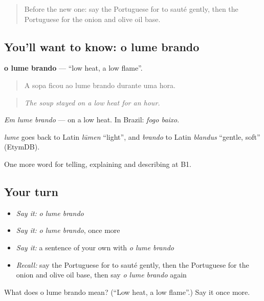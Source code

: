 \label{lesson:PT-C331-lume-brando}



\begin{quote}
Before the new one: say the Portuguese for to sauté gently, then the Portuguese for the onion and olive oil base.
\end{quote}

\subsection*{You'll want to know: o lume brando}
\textbf{o lume brando} — \textquotedblleft{}low heat, a low flame\textquotedblright{}.

\begin{quote}
A sopa ficou ao lume brando durante uma hora.
\end{quote}

\begin{quote}
\emph{The soup stayed on a low heat for an hour.}
\end{quote}

\emph{Em lume brando} — on a low heat. In Brazil: \emph{fogo baixo}.

\begin{cousinweb}
\emph{lume} goes back to Latin \emph{lūmen} \textquotedblleft{}light\textquotedblright{}, and \emph{brando} to Latin \emph{blandus} \textquotedblleft{}gentle, soft\textquotedblright{} (EtymDB).
\end{cousinweb}

\begin{grammarlens}[title={What you've built}]
One more word for telling, explaining and describing at B1.
\end{grammarlens}

\subsection*{Your turn}
\begin{itemize}
\raggedright
  \item \emph{Say it:} \emph{o lume brando}
  \item \emph{Say it:} \emph{o lume brando}, once more
  \item \emph{Say it:} a sentence of your own with \emph{o lume brando}
  \item \emph{Recall:} say the Portuguese for to sauté gently, then the Portuguese for the onion and olive oil base, then say \emph{o lume brando} again
\end{itemize}

\begin{tcolorbox}[breakable,colback=teal!4,colframe=teal!35!black,title={Before you move on}]
What does o lume brando mean? (\textquotedblleft{}Low heat, a low flame\textquotedblright{}.) Say it once more.
\end{tcolorbox}
